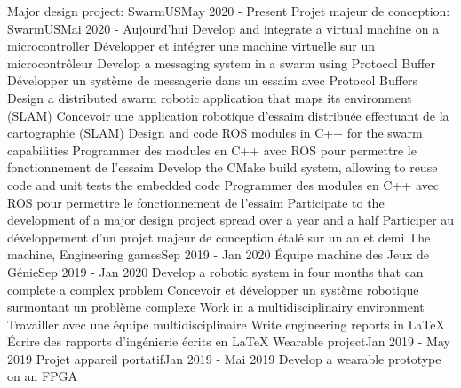 \documentclass[letterpaper,11pt]{resume}
\begin{document}
    \resumeSubHeadingListStart
      \resumeProjectHeadingEnFr
          {Major design project: SwarmUS}{May 2020 - Present}
          {Projet majeur de conception: SwarmUS}{Mai 2020 - Aujourd'hui}
          \resumeItemListStart
            \resumeItemEnFr
                {Develop and integrate a virtual machine on a microcontroller}
                {Développer et intégrer une machine virtuelle sur un microcontrôleur}
            \resumeItemEnFr
                {Develop a messaging system in a swarm using Protocol Buffer}
                {Développer un système de messagerie dans un essaim avec Protocol Buffers}
            \resumeItemEnFr
                {Design a distributed swarm robotic application that maps its environment (SLAM)}
                {Concevoir une application robotique d’essaim distribuée effectuant de la cartographie (SLAM)}
            \resumeItemEnFr
                {Design and code ROS modules in C++ for the swarm capabilities}
                {Programmer des modules en C++ avec ROS pour permettre le fonctionnement de l’essaim}
            \resumeItemEnFr
                {Develop the CMake build system, allowing to reuse code and unit tests the embedded code}
                {Programmer des modules en C++ avec ROS pour permettre le fonctionnement de l’essaim}
            \resumeItemEnFr
                {Participate to the development of a major design project spread over a year and a half}
                {Participer au développement d’un projet majeur de conception étalé sur un an et demi}
          \resumeItemListEnd
      \resumeProjectHeadingEnFr
          {The machine, Engineering games}{Sep 2019 - Jan 2020}
          {Équipe machine des Jeux de Génie}{Sep 2019 - Jan 2020}
          \resumeItemListStart
            \resumeItemEnFr
                {Develop a robotic system in four months that can complete a complex problem}
                {Concevoir et développer un système robotique surmontant un problème complexe}
            \resumeItemEnFr
                {Work in a multidisciplinairy environment}
                {Travailler avec une équipe multidisciplinaire}
            \resumeItemEnFr
                {Write engineering reports in LaTeX}
                {Écrire des rapports d’ingénierie écrits en LaTeX}
          \resumeItemListEnd
      \resumeProjectHeadingEnFr
          {Wearable project}{Jan 2019 - May 2019}
          {Projet appareil portatif}{Jan 2019 - Mai 2019}
          \resumeItemListStart
            \resumeItemEnFr
                {Develop a wearable prototype on an FPGA}
\end{document}
